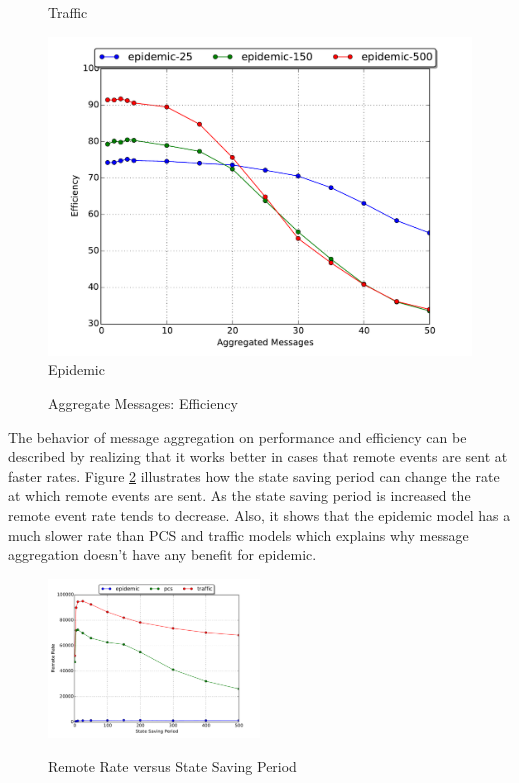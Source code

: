 \documentclass[11pt]{book}
\begin{document}
\begin{figure}
\begin{minipage}{.5\textwidth}
\begin{center}
      Traffic \\
    \end{center}
  \end{minipage}
  \centering
  \begin{minipage}{.5\textwidth}
    \begin{center}
      \includegraphics[width=\textwidth,keepaspectratio,quiet]{figs/partitioning_communication/aggregate_epidemic_efficiency.pdf} \\
      Epidemic \\
    \end{center}
  \end{minipage}
  \caption{Aggregate Messages: Efficiency}\label{aggregate_efficiency}
\end{figure}
  
The behavior of message aggregation on performance and efficiency can be described by realizing
that it works better in cases that remote events are sent at faster rates.  Figure \ref{remote_ssp}
illustrates how the state saving period can change the rate at which remote events are sent.  As
the state saving period is increased the remote event rate tends to decrease.  Also, it shows
that the epidemic model has a much slower rate than PCS and traffic models which explains why
message aggregation doesn't have any benefit for epidemic.

\begin{figure}
  \centering
  \includegraphics[width=0.5\textwidth,keepaspectratio,quiet]{figs/state_saving/beowulf/remote_rate.pdf} \\
  \caption{Remote Rate versus State Saving Period}\label{remote_ssp}
\end{figure}
\end{document}
